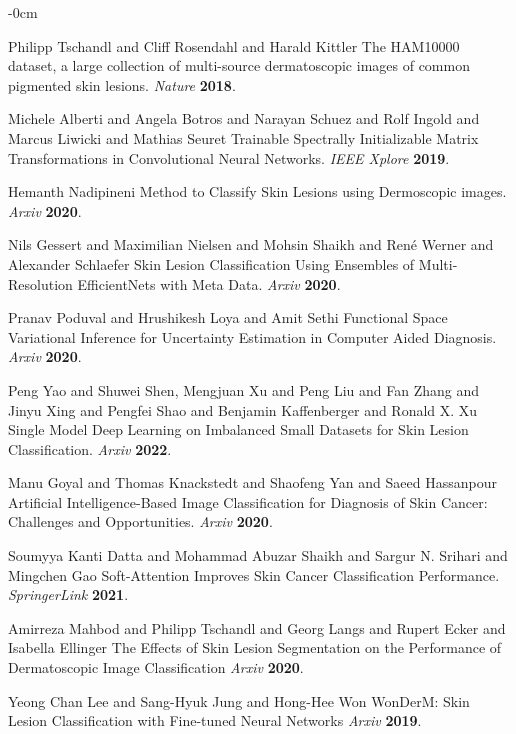\documentclass[sensors,article,submit,pdftex,moreauthors]{Definitions/mdpi}
\begin{document}
\begin{adjustwidth}{-\extralength}{0cm}
\begin{thebibliography}{999}
Philipp Tschandl and Cliff Rosendahl and Harald Kittler The HAM10000 dataset, a large collection of multi-source dermatoscopic images of common pigmented skin lesions. 
{\em Nature} 
{\bf 2018}.

Michele Alberti and Angela Botros and Narayan Schuez and Rolf Ingold and Marcus Liwicki and Mathias Seuret Trainable Spectrally Initializable Matrix Transformations in Convolutional Neural Networks. 
{\em IEEE Xplore} 
{\bf 2019}.

Hemanth Nadipineni Method to Classify Skin Lesions using Dermoscopic images. {\em Arxiv} 
{\bf 2020}.

Nils Gessert and Maximilian Nielsen and Mohsin Shaikh and René Werner and Alexander Schlaefer Skin Lesion Classification Using Ensembles of Multi-Resolution EfficientNets with Meta Data. 
{\em Arxiv} 
{\bf 2020}.

Pranav Poduval and Hrushikesh Loya and Amit Sethi Functional Space Variational Inference for Uncertainty Estimation in Computer Aided Diagnosis. 
{\em Arxiv} 
{\bf 2020}.

Peng Yao and Shuwei Shen, Mengjuan Xu and Peng Liu and Fan Zhang and Jinyu Xing and Pengfei Shao and Benjamin Kaffenberger and Ronald X. Xu Single Model Deep Learning on Imbalanced Small Datasets for Skin Lesion Classification. 
{\em Arxiv} 
{\bf 2022}.

Manu Goyal and Thomas Knackstedt and Shaofeng Yan and Saeed Hassanpour Artificial Intelligence-Based Image Classification for Diagnosis of Skin Cancer: Challenges and Opportunities. 
{\em Arxiv} 
{\bf 2020}.

Soumyya Kanti Datta and  Mohammad Abuzar Shaikh and Sargur N. Srihari and Mingchen Gao Soft-Attention Improves Skin Cancer Classification Performance. {\em SpringerLink} 
{\bf 2021}.

Amirreza Mahbod and Philipp Tschandl and Georg Langs and Rupert Ecker and Isabella Ellinger The Effects of Skin Lesion Segmentation on the Performance of Dermatoscopic Image Classification
{\em Arxiv} 
{\bf 2020}.

Yeong Chan Lee and Sang-Hyuk Jung and Hong-Hee Won WonDerM: Skin Lesion Classification with Fine-tuned Neural Networks
{\em Arxiv} 
{\bf 2019}.


\end{thebibliography}
\end{adjustwidth}
\end{document}
